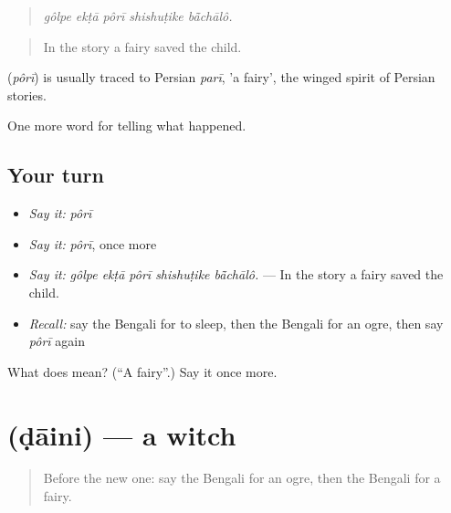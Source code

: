 \begin{quote}
    
\end{quote}

\begin{quote}
\emph{gôlpe ekṭā pôrī shishuṭike bā̃chālô.}
\end{quote}

\begin{quote}
In the story a fairy saved the child.
\end{quote}

\begin{cousinweb}
\textbf{} (\emph{pôrī}) is usually traced to Persian \emph{parī}, 'a fairy', the winged spirit of Persian stories.
\end{cousinweb}

\begin{grammarlens}[title={What you've built}]
One more word for telling what happened.
\end{grammarlens}

\subsection*{Your turn}
\begin{itemize}
\raggedright
  \item \emph{Say it:} \emph{pôrī}
  \item \emph{Say it:} \emph{pôrī}, once more
  \item \emph{Say it:} \emph{gôlpe ekṭā pôrī shishuṭike bā̃chālô.} — In the story a fairy saved the child.
  \item \emph{Recall:} say the Bengali for to sleep, then the Bengali for an ogre, then say \emph{pôrī} again
\end{itemize}

\begin{tcolorbox}[breakable,colback=teal!4,colframe=teal!35!black,title={Before you move on}]
What does  mean? (\textquotedblleft{}A fairy\textquotedblright{}.) Say it once more.
\end{tcolorbox}
\section[\texorpdfstring{\bn{ডাইনি} (ḍāini)}{ডাইনি (ḍāini)}]{ (ḍāini) — a witch}

\label{lesson:BN-C322-daini}



\begin{quote}
Before the new one: say the Bengali for an ogre, then the Bengali for a fairy.
\end{quote}

